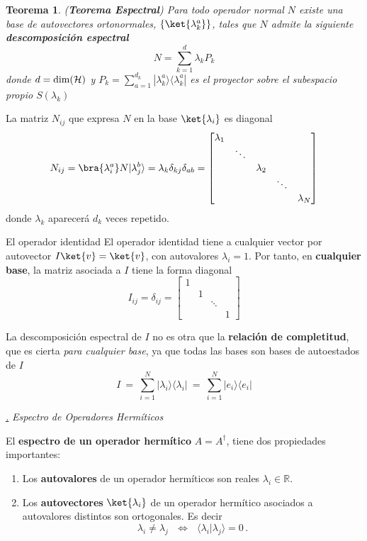 \documentclass[a4paper,11pt]{book} %
\newtheorem{teorema_contador}{Teorema}
\newcommand{\Teorema}[1]{
		\begin{mybox_gray2}{}
			\begin{teorema_contador}
				 #1 
			\end{teorema_contador} 
		\end{mybox_gray2}
	}
\numberwithin{equation}{chapter}
\newcommand{\ketnew}[1]{|#1\rangle}
\newcommand{\braket}[2]{\langle #1|#2\rangle}
\newcommand{\ketbra}[2]{| #1\rangle \! \langle #2|}
\def\subsubiContadorIt{\par\addtocounter{subsubsection}{1}\underline{\it\thesubsubsection.}\hskip0.5cm \setcounter{subsubsubsectionIt}{0}}
\newcommand{\SubsubiIt}[1]{
		\subsubiContadorIt \textit{#1}
	}
\newcounter{subsubsubsectionIt}[subsubsection]
\begin{document}
	\Teorema{ (\textbf{Teorema Espectral}) 
	Para todo operador normal $N$ existe una base de  autovectores ortonormales,  $\{\ket{\lambda^a_k}\}$,  tales que  $N$ admite la siguiente  \textbf{descomposición espectral }
	\begin{equation}
	N = \sum_{k=1}^d \lambda_k   P_k
	\end{equation} 
donde $d=  {\rm dim}(\mathcal{H})$ y $P_k = \sum_{a=1}^{d_k} \ketbra{\lambda^a_k}{\lambda^a_k}$ es el proyector sobre el subespacio propio $S(\lambda_k)$
	}
La matriz $N_{ij}$ que expresa $N$ en la base $\ket{\lambda_i}$ es diagonal 
$$
N_{ij} = \bra{\lambda^a_i} N\ketnew{\lambda^b_j} =  \lambda_k \delta_{kj} \delta_{ab} =\begin{bmatrix} \lambda_1 &  &  &  &  \\ & \ddots & & & \\ & & \lambda_2 & &  \\&  & & \ddots & \\  & & & &  \lambda_N \end{bmatrix}
$$
donde $\lambda_k$ aparecerá $d_k$ veces repetido.

	\begin{mybox_blue}{El operador identidad}
	El operador identidad tiene a cualquier vector por autovector $ I\ket{v} = \ket{v}$, con autovalores $\lambda_ i = 1$. Por tanto, en \textbf{cualquier base}, la matriz asociada a $I$ tiene la forma diagonal
	$$
	I_{ij} = \delta_{ij} = \begin{bmatrix} 1 &  &  &  \\ & 1 & &  \\ & & \ddots & \\ & & &  1 \end{bmatrix}
	$$

	La descomposición espectral de $I$ no es otra que la \textbf{relación de completitud}, que es cierta \textit{para cualquier base}, ya que todas las bases son bases de autoestados de $I$
	$$
	I ~=~ \sum_{i=1}^N \ketbra{\lambda_i}{\lambda_i} ~=~ \sum_{i=1}^N \ketbra{e_i}{e_i}
	$$	
	\end{mybox_blue}

			\SubsubiIt{Espectro de Operadores Hermíticos}

\begin{mybox_gray2}{}
El \textbf{espectro de un operador hermítico}  $A = A^\dagger$,  tiene dos propiedades importantes:
\begin{enumerate}
	\item Los \textbf{autovalores} de un operador hermíticos son reales $\lambda_i \in {\mathbb R}$.
	\item Los \textbf{autovectores} $\ket{\lambda_i}$ de un operador hermítico asociados a autovalores distintos son ortogonales. Es decir
	\begin{equation} \label{ec_op_hermitico_autovec_ortogonal}
	\lambda_i\neq \lambda_j ~~~\Longleftrightarrow ~~~\braket{\lambda_i}{\lambda_j} = 0\, .
	\end{equation}
\end{enumerate} 

\end{mybox_gray2}
\end{document}
